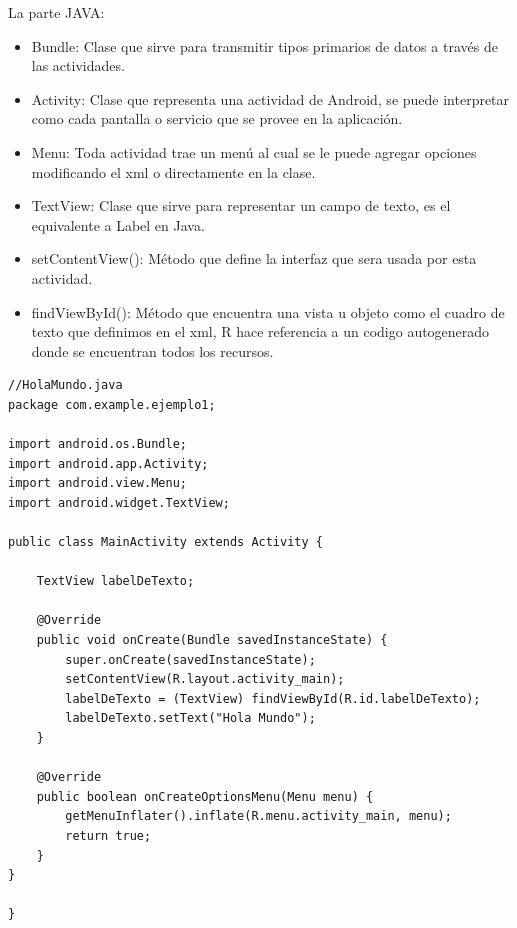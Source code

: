 \documentclass[11pt]{book}
\begin{document}
La parte JAVA:

\begin{itemize}
\item Bundle: Clase que sirve para transmitir tipos primarios de datos a través de las actividades.
\item Activity: Clase que representa una actividad de Android, se puede interpretar como cada pantalla o servicio que se provee en la aplicación.
\item Menu: Toda actividad trae un menú al cual se le puede agregar opciones modificando el xml o directamente en la clase.
\item TextView: Clase que sirve para representar un campo de texto, es el equivalente a Label en Java.
\item setContentView(): Método que define la interfaz que sera usada por esta actividad.
\item findViewById(): Método que encuentra una vista u objeto como el cuadro de texto que definimos en el xml, R hace referencia a un codigo autogenerado donde se encuentran todos los recursos.
\end{itemize}
\newpage
\begin{lstlisting}
//HolaMundo.java
package com.example.ejemplo1;

import android.os.Bundle;
import android.app.Activity;
import android.view.Menu;
import android.widget.TextView;

public class MainActivity extends Activity {
	
    TextView labelDeTexto;

    @Override
    public void onCreate(Bundle savedInstanceState) {
        super.onCreate(savedInstanceState);
        setContentView(R.layout.activity_main);
        labelDeTexto = (TextView) findViewById(R.id.labelDeTexto);
        labelDeTexto.setText("Hola Mundo");
    }

    @Override
    public boolean onCreateOptionsMenu(Menu menu) {
        getMenuInflater().inflate(R.menu.activity_main, menu);
        return true;
    }
}

}

\end{lstlisting}

\end{document}

